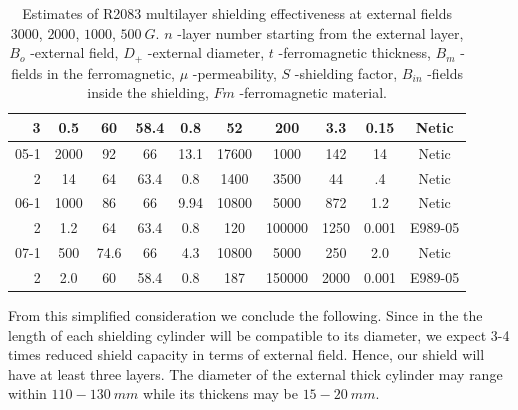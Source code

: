 \documentclass[12pt]{article}
\begin{document}
\begin{table}[htbp]
\begin{center}
\begin{tabular}{|r|c|c|c|c|c|c|c|c|c|}
 3    & 0.5 &   60 &58.4 &  0.8  &  52  &  200      & 3.3  & 0.15 & Netic      \\ \hline \hline
05-1    & 2000& 92  & 66  & 13.1 & 17600 & 1000       & 142  & 14               & Netic    \\ \hline
   2    & 14  & 64  & 63.4& 0.8  & 1400  & 3500       & 44   & .4               & Netic    \\ \hline \hline
 06-1    & 1000& 86  & 66  & 9.94 & 10800 & 5000       & 872  & 1.2    & Netic    \\ \hline
    2    & 1.2 & 64  & 63.4& 0.8  &  120  & 100000     & 1250 & 0.001  & E989-05  \\ \hline \hline
 07-1    & 500 & 74.6& 66  & 4.3  & 10800 & 5000       & 250  & 2.0    & Netic    \\ \hline
    2    & 2.0 & 60  & 58.4& 0.8  & 187   & 150000     & 2000 & 0.001  & E989-05  \\ \hline
\end{tabular}
\end{center}
\caption{Estimates of R2083 multilayer  shielding effectiveness at
 external fields  $3000$, $2000$, $1000$, $500~G$.
 $n$
-layer number starting from the external layer,
 $B_{o}$
-external field,
$D_+$
-external diameter,
$t$
-ferromagnetic thickness,
$B_m$
 -fields in the ferromagnetic, 
$\mu$
-permeability,
$S$
-shielding factor, 
$B_{in}$
-fields inside the shielding,
$Fm$
-ferromagnetic material.
\label{cal2}}
\end{table}
%

From this simplified consideration we conclude the following.
Since in the  the length of each shielding cylinder
will be  compatible to its diameter, we expect 3-4 times reduced  
shield capacity in terms of external field.
Hence, our shield will  have  at least three layers.
The   diameter of the external thick cylinder may  range within  
$110-130~mm$ while its thickens may  be $15-20~mm$.
 
\end{document}
